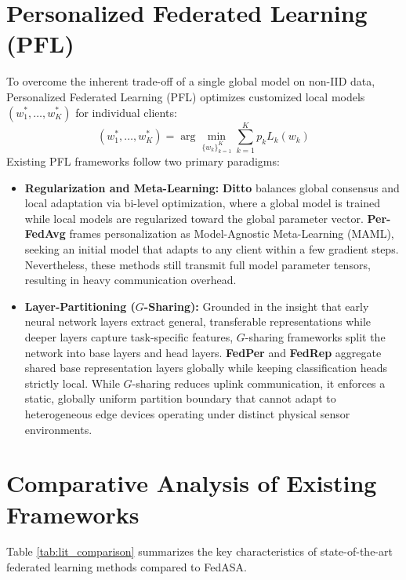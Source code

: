 \documentclass[12pt,a4paper]{report}
\begin{document}
\section{Personalized Federated Learning (PFL)}
To overcome the inherent trade-off of a single global model on non-IID data, Personalized Federated Learning (PFL) optimizes customized local models $(w_1^*, \dots, w_K^*)$ for individual clients:
\begin{equation}
    (w_1^*, \dots, w_K^*) = \arg\min_{\{w_k\}_{k=1}^K} \sum_{k=1}^K p_k L_k(w_k)
\end{equation}
Existing PFL frameworks follow two primary paradigms:
\begin{itemize}
    \item \textbf{Regularization and Meta-Learning:} \textbf{Ditto} \cite{ref_li_ditto} balances global consensus and local adaptation via bi-level optimization, where a global model is trained while local models are regularized toward the global parameter vector. \textbf{Per-FedAvg} \cite{ref_fallah_perfedavg} frames personalization as Model-Agnostic Meta-Learning (MAML), seeking an initial model that adapts to any client within a few gradient steps. Nevertheless, these methods still transmit full model parameter tensors, resulting in heavy communication overhead.
    \item \textbf{Layer-Partitioning ($G$-Sharing):} Grounded in the insight that early neural network layers extract general, transferable representations while deeper layers capture task-specific features, $G$-sharing frameworks split the network into base layers and head layers. \textbf{FedPer} \cite{ref_arivazhagan_fedper} and \textbf{FedRep} \cite{ref_collins_fedrep} aggregate shared base representation layers globally while keeping classification heads strictly local. While $G$-sharing reduces uplink communication, it enforces a static, globally uniform partition boundary that cannot adapt to heterogeneous edge devices operating under distinct physical sensor environments.
\end{itemize}

\section{Comparative Analysis of Existing Frameworks}
Table \ref{tab:lit_comparison} summarizes the key characteristics of state-of-the-art federated learning methods compared to FedASA.
\end{document}
